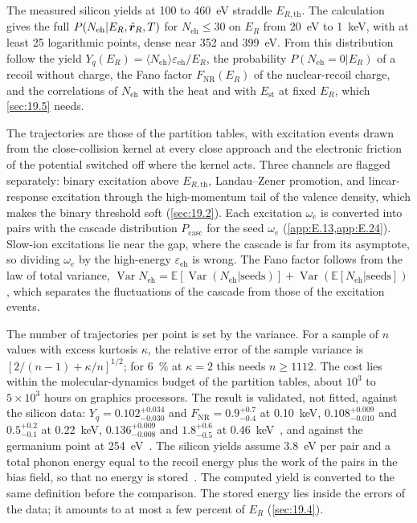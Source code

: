 The measured silicon yields at 100 to \SI{460}{eV} straddle $E_{R,\mathrm{th}}$. The calculation gives the full $P(N_{\mathrm{eh}}|E_R, \hat{\bm{r}}_R, T)$ for $N_{\mathrm{eh}} \le 30$ on $E_R$ from \SI{20}{eV} to \SI{1}{keV}, with at least 25 logarithmic points, dense near 352 and \SI{399}{eV}. From this distribution follow the yield $Y_q(E_R) = \langle N_{\mathrm{eh}}\rangle\varepsilon_{\mathrm{eh}}/E_R$, the probability $P(N_{\mathrm{eh}} = 0|E_R)$ of a recoil without charge, the Fano factor $F_{\mathrm{NR}}(E_R)$ of the nuclear-recoil charge, and the correlations of $N_{\mathrm{eh}}$ with the heat and with $E_{\mathrm{st}}$ at fixed $E_R$, which \cref{sec:19.5} needs.

The trajectories are those of the partition tables, with excitation events drawn from the close-collision kernel at every close approach and the electronic friction of the potential switched off where the kernel acts. Three channels are flagged separately: binary excitation above $E_{R,\mathrm{th}}$, Landau--Zener promotion, and linear-response excitation through the high-momentum tail of the valence density, which makes the binary threshold soft (\cref{sec:19.2}). Each excitation $\omega_e$ is converted into pairs with the cascade distribution $P_{\mathrm{casc}}$ for the seed $\omega_e$ (\cref{app:E.13,app:E.24}). Slow-ion excitations lie near the gap, where the cascade is far from its asymptote, so dividing $\omega_e$ by the high-energy $\varepsilon_{\mathrm{eh}}$ is wrong. The Fano factor follows from the law of total variance, $\operatorname{Var}N_{\mathrm{eh}} = \mathbb{E}[\operatorname{Var}(N_{\mathrm{eh}}|\text{seeds})] + \operatorname{Var}(\mathbb{E}[N_{\mathrm{eh}}|\text{seeds}])$, which separates the fluctuations of the cascade from those of the excitation events.

The number of trajectories per point is set by the variance. For a sample of $n$ values with excess kurtosis $\kappa$, the relative error of the sample variance is $[2/(n - 1) + \kappa/n]^{1/2}$; for \SI{6}{\percent} at $\kappa = 2$ this needs $n \ge 1112$. The cost lies within the molecular-dynamics budget of the partition tables, about $10^3$ to $5\times10^3$ hours on graphics processors. The result is validated, not fitted, against the silicon data: $Y_q = 0.102^{+0.034}_{-0.030}$ and $F_{\mathrm{NR}} = 0.9^{+0.7}_{-0.4}$ at \SI{0.10}{keV}, $0.108^{+0.009}_{-0.010}$ and $0.5^{+0.2}_{-0.1}$ at \SI{0.22}{keV}, $0.136^{+0.009}_{-0.008}$ and $1.8^{+0.6}_{-0.5}$ at \SI{0.46}{keV}~\cite[Table~II]{albakry2023first}, and against the germanium point at \SI{254}{eV}~\cite{kavner2024measurement}. The silicon yields assume \SI{3.8}{eV} per pair and a total phonon energy equal to the recoil energy plus the work of the pairs in the bias field, so that no energy is stored~\cite[Eq.~(1)]{albakry2023first}. The computed yield is converted to the same definition before the comparison. The stored energy lies inside the errors of the data; it amounts to at most a few percent of $E_R$ (\cref{sec:19.4}).

